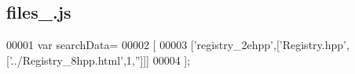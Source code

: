\subsection{files\+\_.\+js}
\label{files__6_8js_source}

\begin{DoxyCode}
00001 var searchData=
00002 [
00003   [\textcolor{stringliteral}{'registry\_2ehpp'},[\textcolor{stringliteral}{'Registry.hpp'},[\textcolor{stringliteral}{'../Registry\_8hpp.html'},1,\textcolor{stringliteral}{''}]]]
00004 ];
\end{DoxyCode}
